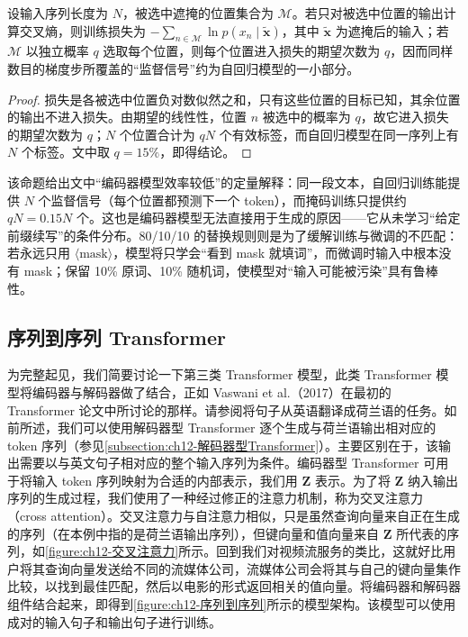 \documentclass[../../main.tex]{subfiles}
\begin{document}
\begin{proposition}[掩码语言建模的损失覆盖]\label{proposition:ch12-掩码损失}
设输入序列长度为 $N$，被选中遮掩的位置集合为 $\mathcal{M}$。若只对被选中位置的输出计算交叉熵，则训练损失为 $-\sum_{n\in\mathcal{M}}\ln p\left(x_n\mid\tilde{\mathbf{x}}\right)$，其中 $\tilde{\mathbf{x}}$ 为遮掩后的输入；若 $\mathcal{M}$ 以独立概率 $q$ 选取每个位置，则每个位置进入损失的期望次数为 $q$，因而同样数目的梯度步所覆盖的“监督信号”约为自回归模型的一小部分。
\end{proposition}

\begin{proof}
损失是各被选中位置负对数似然之和，只有这些位置的目标已知，其余位置的输出不进入损失。由期望的线性性，位置 $n$ 被选中的概率为 $q$，故它进入损失的期望次数为 $q$；$N$ 个位置合计为 $qN$ 个有效标签，而自回归模型在同一序列上有 $N$ 个标签。文中取 $q=15\%$，即得结论。
\end{proof}

\begin{remark}
该命题给出文中“编码器模型效率较低”的定量解释：同一段文本，自回归训练能提供 $N$ 个监督信号（每个位置都预测下一个 token），而掩码训练只提供约 $qN=0.15N$ 个。这也是编码器模型无法直接用于生成的原因——它从未学习“给定前缀续写”的条件分布。80/10/10 的替换规则则是为了缓解训练与微调的不匹配：若永远只用 $\langle\mathrm{mask}\rangle$，模型将只学会“看到 mask 就填词”，而微调时输入中根本没有 mask；保留 10\% 原词、10\% 随机词，使模型对“输入可能被污染”具有鲁棒性。
\end{remark}

\subsection{序列到序列 Transformer}\label{subsection:ch12-序列到序列Transformer}

为完整起见，我们简要讨论一下第三类 Transformer 模型，此类 Transformer 模型将编码器与解码器做了结合，正如 Vaswani et al.（2017）在最初的 Transformer 论文中所讨论的那样。请参阅将句子从英语翻译成荷兰语的任务。如前所述，我们可以使用解码器型 Transformer 逐个生成与荷兰语输出相对应的 token 序列（参见\cref{subsection:ch12-解码器型Transformer}）。主要区别在于，该输出需要以与英文句子相对应的整个输入序列为条件。编码器型 Transformer 可用于将输入 token 序列映射为合适的内部表示，我们用 $\mathbf{Z}$ 表示。为了将 $\mathbf{Z}$ 纳入输出序列的生成过程，我们使用了一种经过修正的注意力机制，称为交叉注意力（cross attention）。交叉注意力与自注意力相似，只是虽然查询向量来自正在生成的序列（在本例中指的是荷兰语输出序列），但键向量和值向量来自 $\mathbf{Z}$ 所代表的序列，如\cref{figure:ch12-交叉注意力}所示。回到我们对视频流服务的类比，这就好比用户将其查询向量发送给不同的流媒体公司，流媒体公司会将其与自己的键向量集作比较，以找到最佳匹配，然后以电影的形式返回相关的值向量。将编码器和解码器组件结合起来，即得到\cref{figure:ch12-序列到序列}所示的模型架构。该模型可以使用成对的输入句子和输出句子进行训练。
\end{document}
